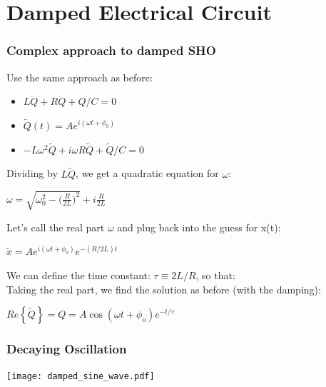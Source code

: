 \documentclass[pdf,hideothersubsections]{beamer}
\begin{document}
\section{Damped Electrical Circuit}
\begin{frame}
\frametitle{Complex approach to damped SHO}
Use the same approach as before:
\begin{itemize}
\item $L \ddot{Q} + R \dot{Q} + Q/C = 0$
\pause
\item $\tilde{Q}(t) = A e^{i (\omega t + \phi_0)}$
\pause
\item $-L \omega^2 \tilde{Q} + i \omega R \tilde{Q} + \tilde{Q}/C = 0$
\end{itemize}
\pause
Dividing by $L \tilde{Q}$, we get a quadratic equation for $\omega$: \\
\pause
\begin{center}
$\omega = \sqrt{\omega_0^2 - \Big(\frac{R}{2 L}\Big)^2} + i \frac{R}{2 L}$ \\
\end{center}
\pause
Let's call the real part $\omega$ and plug back into the guess for x(t):
\pause
\begin{center}
$\tilde{x} = A e^{i (\omega t + \phi_0)} e^{-(R/2 L) t}$\\
\end{center}
\pause
We can define the time constant: $\tau \equiv 2 L/R$, so that: \\
\pause
Taking the real part, we find the solution as before (with the damping): \\
\pause
\begin{center}
$Re\left\{\tilde{Q}\right\} = Q = A \cos(\omega t + \phi_o) e^{-t/\tau}$
\end{center}

\end{frame}


\begin{frame}
\frametitle{Decaying Oscillation}

\centering
\texttt{[image: damped\_sine\_wave.pdf]}

\end{frame}
\end{document}
